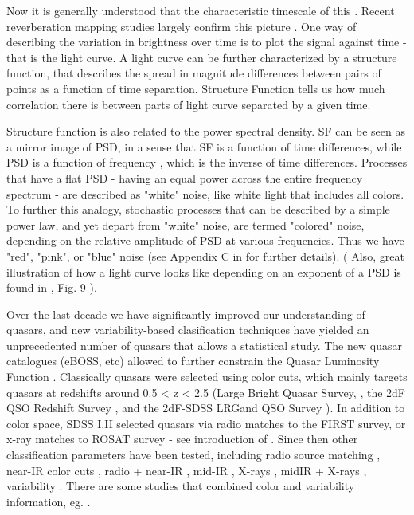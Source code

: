 \documentclass[modern]{aastex62}
\begin{document}
Now it is generally understood that the characteristic timescale of this . Recent reverberation mapping studies largely confirm this picture \citep{sun2015}. One way of describing the variation in brightness over time is to plot the signal against time - that is the light curve.  A light curve can be further characterized by a structure function, that describes the spread in magnitude differences between pairs of points as a function of time separation. Structure Function tells us how much correlation there is between parts of light curve separated by a given time.  

Structure function is also related to the power spectral density. SF can be seen as a mirror image of PSD, in a sense that SF is a function of time differences, while PSD is a function of frequency , which is the inverse of  time differences. Processes that have a flat PSD - having an equal power across the entire frequency spectrum -  are described as "white" noise, like white light that includes all colors. To further this analogy, stochastic processes that can be described by a simple power law, and yet depart from "white" noise, are termed  "colored" noise, depending on the relative amplitude of PSD at various frequencies. Thus we have "red", "pink", or "blue" noise   (see Appendix  C in \cite{kasliwal2017} for further details). ( Also, great illustration of how a light curve looks like depending on an exponent of a PSD is found in \cite{macleod2010}, Fig. 9 ). 



Over the last decade we have significantly improved our understanding of quasars, and new variability-based clasification techniques \citep{fan2001, richards2006, kozlowski2010, palanque2011, macleod2011, graham2014, alsayyad2016, ruan2017} have yielded an unprecedented number of quasars that allows a statistical study. The new quasar catalogues (eBOSS, etc) allowed  to further constrain the Quasar Luminosity Function \citep{ross2013, myers2015, palanque2016}. Classically quasars were selected using color cuts,  which mainly targets quasars at redshifts around 0.5 < z < 2.5 (Large Bright Quasar Survey, \cite{hewett1995}, the 2dF QSO Redshift Survey \cite{croom2004}, and the 2dF-SDSS LRGand QSO Survey \cite{croom2009}).  In addition to color space, SDSS I,II selected quasars via radio matches to the FIRST survey, or x-ray matches to ROSAT survey  - see introduction of \citep{myers2015}. Since then other classification parameters have been tested, including radio source matching \citep{mcgreer2009}, near-IR color cuts \citep{banerji2012},  radio + near-IR \citep{glikman2012}, mid-IR \citep{stern2005, richards2009a, stern2012}, X-rays \citep{trichas2012},  midIR + X-rays \citep{lacy2004, hickox2007, hickox2009}, variability \citep{schmidt2010, butler2011, macleod2011, palanque2011}. There are some studies that combined color and variability information, eg. \cite{tie2017, peters2015, sesar2007}. 
\end{document}
